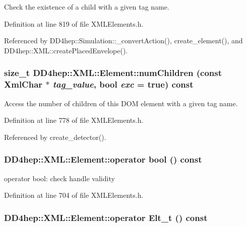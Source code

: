 Check the existence of a child with a given tag name. 

Definition at line 819 of file XMLElements.h.

Referenced by DD4hep::Simulation::\_\-convertAction(), create\_\-element(), and DD4hep::XML::createPlacedEnvelope().\hypertarget{class_d_d4hep_1_1_x_m_l_1_1_element_a985dff64b8864d1954d7dc7a1a77b1af}{
\subsubsection[{numChildren}]{\setlength{\rightskip}{0pt plus 5cm}size\_\-t DD4hep::XML::Element::numChildren (const {\bf XmlChar} $\ast$ {\em tag\_\-value}, \/  bool {\em exc} = {\ttfamily true}) const}}
\label{class_d_d4hep_1_1_x_m_l_1_1_element_a985dff64b8864d1954d7dc7a1a77b1af}


Access the number of children of this DOM element with a given tag name. 

Definition at line 778 of file XMLElements.h.

Referenced by create\_\-detector().\hypertarget{class_d_d4hep_1_1_x_m_l_1_1_element_aae23b243716ff238b24882fb15cdeb70}{
\subsubsection[{operator bool}]{\setlength{\rightskip}{0pt plus 5cm}DD4hep::XML::Element::operator bool () const}}
\label{class_d_d4hep_1_1_x_m_l_1_1_element_aae23b243716ff238b24882fb15cdeb70}


operator bool: check handle validity 

Definition at line 704 of file XMLElements.h.\hypertarget{class_d_d4hep_1_1_x_m_l_1_1_element_abbb79834a9c68a8dbe88e496b7af8d0e}{
\subsubsection[{operator Elt\_\-t}]{\setlength{\rightskip}{0pt plus 5cm}DD4hep::XML::Element::operator {\bf Elt\_\-t} () const}}
\label{class_d_d4hep_1_1_x_m_l_1_1_element_abbb79834a9c68a8dbe88e496b7af8d0e}


